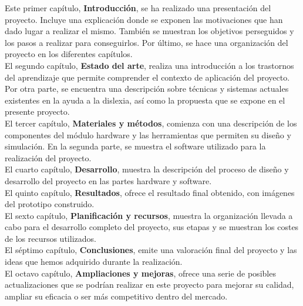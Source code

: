 Este primer capítulo, \textbf{Introducción}, se ha realizado una presentación del proyecto. Incluye una explicación donde se exponen las motivaciones que han dado lugar a realizar el mismo. También se muestran los objetivos perseguidos y los pasos a realizar para conseguirlos. Por último, se hace una organización del proyecto en los diferentes capítulos. 
\\

El segundo capítulo, \textbf{Estado del arte}, realiza una introducción a los trastornos del aprendizaje que permite comprender el contexto de aplicación del proyecto. Por otra parte, se encuentra una descripción sobre técnicas y sistemas actuales existentes en la ayuda a la dislexia, así como la propuesta que se expone en el presente proyecto.
\\

El tercer capítulo, \textbf{Materiales y métodos}, comienza con una descripción de los componentes del módulo hardware y las herramientas que permiten su diseño y simulación. En la segunda parte, se muestra el software utilizado para la realización del proyecto.
\\

El cuarto capítulo, \textbf{Desarrollo}, muestra la descripción del proceso de diseño y desarrollo del proyecto en las partes hardware y software.
\\

El quinto capítulo, \textbf{Resultados}, ofrece el resultado final obtenido, con imágenes del prototipo construido. 
\\

El sexto capítulo, \textbf{Planificación y recursos}, muestra la organización llevada a cabo para el desarrollo completo del proyecto, sus etapas y se muestran los costes de los recursos utilizados.
\\

El séptimo capítulo, \textbf{Conclusiones}, emite una valoración final del proyecto y las ideas que hemos adquirido durante la realización.
\\

El octavo capítulo, \textbf{Ampliaciones y mejoras}, ofrece una serie de posibles actualizaciones que se podrían realizar en este proyecto para mejorar su calidad, ampliar su eficacia o ser más competitivo dentro del mercado.